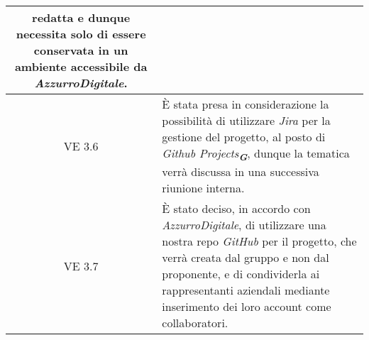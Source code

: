 \begin{table}[htbp]
\begin{tabular}{|c|p{}|}
        redatta e dunque necessita solo di essere conservata in un ambiente accessibile da \emph{AzzurroDigitale}. \\
        \hline
        VE 3.6 & È stata presa in considerazione la possibilità di utilizzare \emph{Jira} per la gestione del progetto, al posto di 
        \emph{Github Projects}\textsubscript{\textit{\textbf{G}}}, dunque la tematica verrà discussa in una successiva riunione interna. \\
        \hline
        VE 3.7 & È stato deciso, in accordo con \emph{AzzurroDigitale}, di utilizzare una nostra repo \emph{GitHub} per il progetto, che verrà creata dal gruppo
        e non dal proponente, e di condividerla ai rappresentanti aziendali mediante inserimento dei loro account come collaboratori. \\
        \hline
    \end{tabular}
    \end{table}
